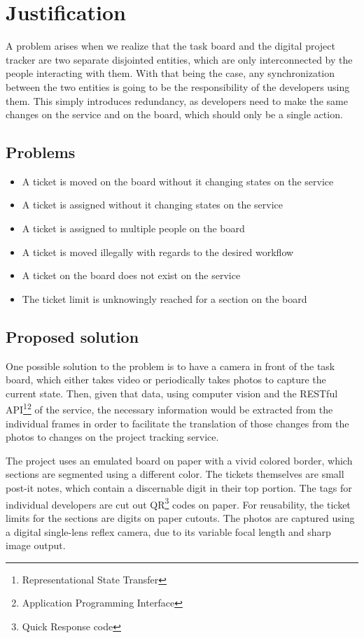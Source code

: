 \documentclass[12pt]{report}
\theoremstyle{definition}
\theoremstyle{remark}
\begin{document}
\section{Justification}
A problem arises when we realize that the task board and the digital project tracker are two separate disjointed entities, which are only interconnected by the people interacting with them. With that being the case, any synchronization between the two entities is going to be the responsibility of the developers using them. This simply introduces redundancy, as developers need to make the same changes on the service and on the board, which should only be a single action.

\subsection{Problems}
\label{subsec:problems}
\begin{itemize}
    \item A ticket is moved on the board without it changing states on the service
    \item A ticket is assigned without it changing states on the service
    \item A ticket is assigned to multiple people on the board
    \item A ticket is moved illegally with regards to the desired workflow
    \item A ticket on the board does not exist on the service
    \item The ticket limit is unknowingly reached for a section on the board 
\end{itemize}

\subsection{Proposed solution}
One possible solution to the problem is to have a camera in front of the task board, which either takes video or periodically takes photos to capture the current state. Then, given that data, using computer vision and the RESTful API\footnote{Representational State Transfer}\footnote{Application Programming Interface} of the service, the necessary information would be extracted from the individual frames in order to facilitate the translation of those changes from the photos to changes on the project tracking service.

The project uses an emulated board on paper with a vivid colored border, which sections are segmented using a different color. The tickets themselves are small post-it notes, which contain a discernable digit in their top portion. The tags for individual developers are cut out QR\footnote{Quick Response code} codes on paper. For reusability, the ticket limits for the sections are digits on paper cutouts. The photos are captured using a digital single-lens reflex camera, due to its variable focal length and sharp image output.
\end{document}
